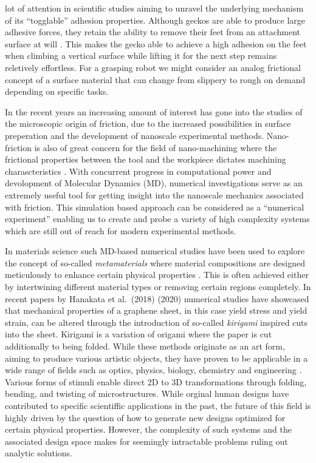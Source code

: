 lot of attention in scientific studies aiming to unravel the underlying
mechanism of its ``togglable'' adhesion properties. Although geckos are able to
produce large adhesive forces, they retain the ability to remove their feet from
an attachment surface at will \cite{Gekko}. This makes the gecko able to achieve
a high adhesion on the feet when climbing a vertical surface while lifting it
for the next step remains reletively effortless. For a grasping robot we might
consider an analog frictional concept of a surface material that can change from
slippery to rough on demand depending on specific tasks.

In the recent years an increasing amount of interest has gone into the studies
of the microscopic origin of friction, due to the increased possibilities in
surface preperation and the development of nanoscale experimental methods.
Nano-friction is also of great concern for the field of nano-machining where the
frictional properties between the tool and the workpiece dictates machining
charascteristics \cite{kim_nano-scale_2009}. With concurrent progress in
computational power and devolopment of Molecular Dynamics (\acrshort{MD}),
numerical investigations serve as an extremely useful tool for getting insight
into the nanoscale mechanics associated with friction. This simulation based
approach can be considered as a ``numerical experiment'' enabling us to create
and probe a variety of high complexity systems which are still out of reach for
modern experimental methods.

In materials science such \acrshort{MD}-based numerical studies have been used
to explore the concept of so-called \textit{metamaterials} where material
compositions are designed meticulously to enhance certain physical properties
\cite{PhysRevLett.121.255304}\cite{PhysRevResearch.2.042006}\cite{graphene/hBN}\cite{Mao}\cite{Yang}\cite{Forte}.
This is often achieved either by intertwining different material types or
removing certain regions completely. In recent papers by Hanakata et al.\
\cite{PhysRevLett.121.255304}(2018) \cite{PhysRevResearch.2.042006}(2020)
numerical studies have showcased that mechanical properties of a graphene sheet,
in this case yield stress and yield strain, can be altered through the
introduction of so-called \textit{kirigami} inspired cuts into the sheet.
Kirigami is a variation of origami where the paper is cut additionally to being
folded. While these methods originate as an art form, aiming to produce various
artistic objects, they have proven to be applicable in a wide range of fields
such as optics, physics, biology, chemistry and engineering
\cite{chen_kirigamiorigami_2020}. Various forms of stimuli enable direct 2D to
3D transformations through folding, bending, and twisting of microstructures.
While orginal human designs have contributed to specific scientiffic
applications in the past, the future of this field is highly driven by the
question of how to generate new designs optimized for certain physical
properties. However, the complexity of such systems and the associated design
space makes for seemingly intractable problems ruling out analytic solutions.


